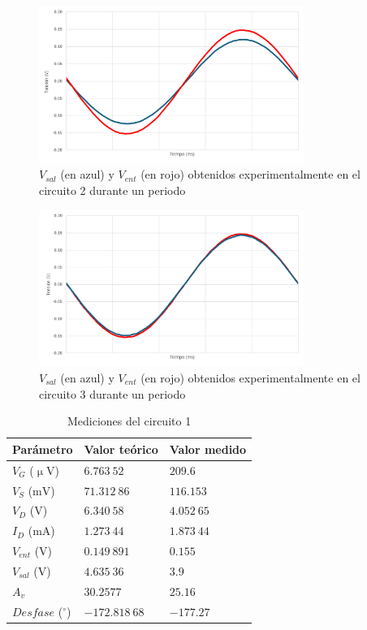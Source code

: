 \documentclass[journal]{IEEEtran}
\begin{document}
\begin{figure}[H]
        \centering
        \includegraphics[width=3.4in]{C2222.png}
        \caption{$V_{sal}$ (en azul) y $V_{ent}$ (en rojo) obtenidos experimentalmente en el circuito 2 durante un periodo}
        \label{fig:SignalExperimental_03}
\end{figure}

\begin{figure}[H]
        \centering
        \includegraphics[width=3.4in]{2C2222.png}
        \caption{$V_{sal}$ (en azul) y $V_{ent}$ (en rojo) obtenidos experimentalmente en el circuito 3 durante un periodo}
        \label{fig:SignalExperimental_04}
\end{figure}

\begin{table}[H]
        \renewcommand{\arraystretch}{1.5}
        \caption{Mediciones del circuito 1}
        \centering
        \begin{tabular}{ >{\centering\arraybackslash}m{2.5cm} >{\centering\arraybackslash}m{2.5cm} >{\centering\arraybackslash}m{2.5cm} }
                \hline
            Parámetro & Valor teórico & Valor medido\\ 
            \hline
            $V_G$ ($\upmu\mathrm{V}$) & $6.763~52$  & $209.6$  \\ 
            $V_S$ ($\mathrm{mV}$) & $71.312~86$  & $116.153$  \\
            $V_D$ ($\mathrm{V}$) & $6.340~58$  & $4.052~65$  \\
            $I_D$ ($\mathrm{mA}$) & $1.273~44$  & $1.873~44$  \\
            $V_{ent}$ ($\mathrm{V}$) & $0.149~891$  & $0.155$ \\ 
            $V_{sal}$ ($\mathrm{V}$) & $4.635~36$ & $3.9$  \\
            $A_v$ & $30.2577$ & $25.16$ \\
            $Desfase$ ($^\circ$) & $-172.818~68$  & $-177.27$ \\
            \hline
        \end{tabular}
        \label{tabla6}
    \end{table}
\end{document}
